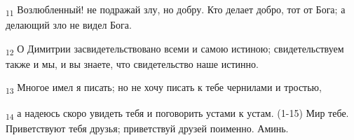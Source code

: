 \begin{tcolorbox}
\textsubscript{11} Возлюбленный! не подражай злу, но добру. Кто делает добро, тот от Бога; а делающий зло не видел Бога.
\end{tcolorbox}
\begin{tcolorbox}
\textsubscript{12} О Димитрии засвидетельствовано всеми и самою истиною; свидетельствуем также и мы, и вы знаете, что свидетельство наше истинно.
\end{tcolorbox}
\begin{tcolorbox}
\textsubscript{13} Многое имел я писать; но не хочу писать к тебе чернилами и тростью,
\end{tcolorbox}
\begin{tcolorbox}
\textsubscript{14} а надеюсь скоро увидеть тебя и поговорить устами к устам. (1-15) Мир тебе. Приветствуют тебя друзья; приветствуй друзей поименно. Аминь.
\end{tcolorbox}
